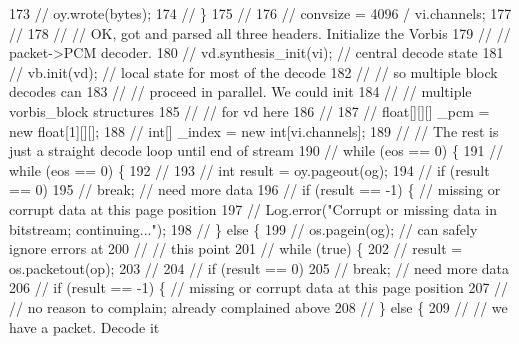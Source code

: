 \begin{DoxyCode}
173 \textcolor{comment}{//              oy.wrote(bytes);}
174 \textcolor{comment}{//          \}}
175 \textcolor{comment}{//}
176 \textcolor{comment}{//          convsize = 4096 / vi.channels;}
177 \textcolor{comment}{//}
178 \textcolor{comment}{//          // OK, got and parsed all three headers. Initialize the Vorbis}
179 \textcolor{comment}{//          //  packet->PCM decoder.}
180 \textcolor{comment}{//          vd.synthesis\_init(vi); // central decode state}
181 \textcolor{comment}{//          vb.init(vd); // local state for most of the decode}
182 \textcolor{comment}{//          // so multiple block decodes can}
183 \textcolor{comment}{//          // proceed in parallel.  We could init}
184 \textcolor{comment}{//          // multiple vorbis\_block structures}
185 \textcolor{comment}{//          // for vd here}
186 \textcolor{comment}{//}
187 \textcolor{comment}{//          float[][][] \_pcm = new float[1][][];}
188 \textcolor{comment}{//          int[] \_index = new int[vi.channels];}
189 \textcolor{comment}{//          // The rest is just a straight decode loop until end of stream}
190 \textcolor{comment}{//          while (eos == 0) \{}
191 \textcolor{comment}{//              while (eos == 0) \{}
192 \textcolor{comment}{//}
193 \textcolor{comment}{//                  int result = oy.pageout(og);}
194 \textcolor{comment}{//                  if (result == 0)}
195 \textcolor{comment}{//                      break; // need more data}
196 \textcolor{comment}{//                  if (result == -1) \{ // missing or corrupt data at this page position}
197 \textcolor{comment}{//                      Log.error("Corrupt or missing data in bitstream; continuing...");}
198 \textcolor{comment}{//                  \} else \{}
199 \textcolor{comment}{//                      os.pagein(og); // can safely ignore errors at}
200 \textcolor{comment}{//                      // this point}
201 \textcolor{comment}{//                      while (true) \{}
202 \textcolor{comment}{//                          result = os.packetout(op);}
203 \textcolor{comment}{//}
204 \textcolor{comment}{//                          if (result == 0)}
205 \textcolor{comment}{//                              break; // need more data}
206 \textcolor{comment}{//                          if (result == -1) \{ // missing or corrupt data at this page position}
207 \textcolor{comment}{//                              // no reason to complain; already complained above}
208 \textcolor{comment}{//                          \} else \{}
209 \textcolor{comment}{//                              // we have a packet.  Decode it}

\end{DoxyCode}
